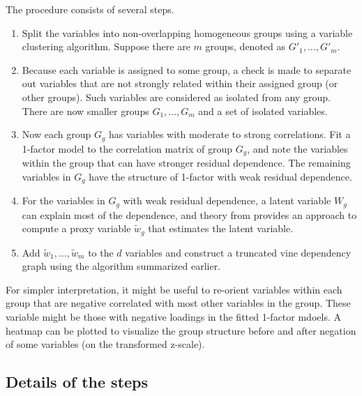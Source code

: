 \documentclass[a4paper]{article}
\begin{document}
The procedure consists of several steps.
\begin{enumerate}
\item Split the variables into non-overlapping homogeneous groups
  using a variable clustering algorithm. Suppose there are $m$ groups,
  denoted as $G'_1,\ldots,G'_m$.
\item Because each variable is assigned to some group, a check is made to separate out variables
  that are not strongly related within their assigned group (or other
  groups).  Such variables are considered as isolated from any group.
  There are now smaller groups $G_1,\ldots,G_m$ and a set of isolated
  variables.
\item Now each group $G_g$ has variables with moderate to strong
  correlations.  Fit a 1-factor model to the correlation matrix of
  group $G_g$, and note the variables within the group that can have
  stronger residual dependence.  The remaining variables in $G_g$ have
  the structure of 1-factor with weak residual dependence.

\item For the variables in $G_g$ with weak residual dependence, a
  latent variable $W_g$ can explain most of the dependence, and theory
  from \cite{krupskii2022approximate} provides an approach to compute
  a proxy variable ${\widetilde w}_g $ that estimates the latent
  variable.
\item Add ${\widetilde w}_1,\ldots,{\widetilde w}_m$ to the $d$ variables and 
construct a truncated vine dependency graph using the algorithm
summarized earlier. 
\end{enumerate}

For simpler interpretation, it might be useful to re-orient variables
within each group that are negative correlated with most other
variables in the group. These variable might be those with negative
loadings in the fitted 1-factor mdoels.  A heatmap can be plotted to
visualize the group structure before and after negation of some
variables (on the transformed z-scale).


\subsection{Details of the steps}
\label{sec-details}
\end{document}
